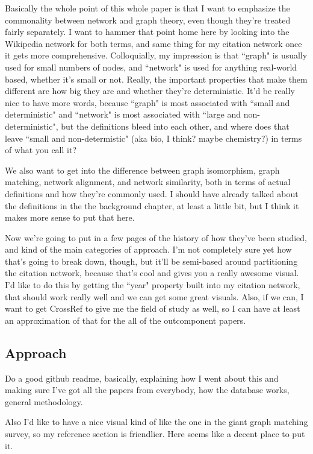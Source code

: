 \documentclass[12pt]{thesis}
\theoremstyle{plain}
\theoremstyle{definition}
\theoremstyle{remark}
\begin{document}
Basically the whole point of this whole paper is that I want to emphasize the commonality between network and graph theory, even though they're treated fairly separately. I want to hammer that point home here by looking into the Wikipedia network for both terms, and same thing for my citation network once it gets more comprehensive. Colloquially, my impression is that ``graph" is usually used for small numbers of nodes, and ``network" is used for anything real-world based, whether it's small or not. Really, the important properties that make them different are how big they are and whether they're deterministic. It'd be really nice to have more words, because ``graph" is most associated with ``small and deterministic" and ``network" is most associated with ``large and non-deterministic", but the definitions bleed into each other, and where does that leave ``small and non-determistic" (aka bio, I think? maybe chemistry?) in terms of what you call it?

We also want to get into the difference between graph isomorphism, graph matching, network alignment, and network similarity, both in terms of actual definitions and how they're commonly used. I should have already talked about the definitions in the the background chapter, at least a little bit, but I think it makes more sense to put that here.

Now we're going to put in a few pages of the history of how they've been studied, and kind of the main categories of approach. I'm not completely sure yet how that's going to break down, though, but it'll be semi-based around partitioning the citation network, because that's cool and gives you a really awesome visual. I'd like to do this by getting the ``year" property built into my citation network, that should work really well and we can get some great visuals. Also, if we can, I want to get CrossRef to give me the field of study as well, so I can have at least an approximation of that for the all of the outcomponent papers.

\subsection{Approach}

Do a good github readme, basically, explaining how I went about this and making sure I've got all the papers from everybody, how the database works, general methodology.

Also I'd like to have a nice visual kind of like the one in the giant graph matching survey, so my reference section is friendlier. Here seems like a decent place to put it.
\end{document}

